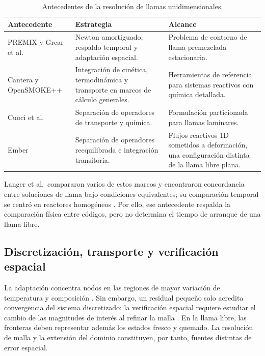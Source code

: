 \documentclass[12pt,a4paper,twoside,openany]{book}
\begin{document}
\begin{table}[htbp]
\centering
\small
\caption{Antecedentes de la resolución de llamas unidimensionales.}
\label{tab:state-art-solvers}
\begin{tabularx}{\textwidth}{@{}p{}YY@{}}
\toprule
\textbf{Antecedente} & \textbf{Estrategia} & \textbf{Alcance} \\
\midrule
PREMIX y Grcar et al.\ \cite{KeePremix1998,Grcar1988} &
Newton amortiguado, respaldo temporal y adaptación espacial. &
Problema de contorno de llama premezclada estacionaria. \\
Cantera y OpenSMOKE++ \cite{GoodwinCantera2025,CuociOpenSMOKE2015} &
Integración de cinética, termodinámica y transporte en marcos de cálculo
generales. &
Herramientas de referencia para sistemas reactivos con química detallada. \\
Cuoci et al.\ \cite{CuociOperatorSplitting2013} &
Separación de operadores de transporte y química. &
Formulación particionada para llamas laminares. \\
Ember \cite{LongEmber2018} &
Separación de operadores reequilibrada e integración transitoria. &
Flujos reactivos 1D sometidos a deformación, una configuración distinta
de la llama libre plana. \\
\bottomrule
\end{tabularx}
\end{table}

Langer et al.\ compararon varios de estos marcos y encontraron concordancia
entre soluciones de llama bajo condiciones equivalentes; su comparación
temporal se centró en reactores homogéneos \cite{Langer2018}. Por ello, ese
antecedente respalda la comparación física entre códigos, pero no determina
el tiempo de arranque de una llama libre.

\subsection{Discretización, transporte y verificación espacial}
\label{sec:discretization-transport-mesh}

La adaptación concentra nodos en las regiones de mayor variación de temperatura
y composición \cite{KeePremix1998,Smooke1991}. Sin embargo, un residual pequeño
solo acredita convergencia del sistema discretizado: la verificación espacial
requiere estudiar el cambio de las magnitudes de interés al refinar la malla
\cite{Roache1998}. En la llama libre, las fronteras deben representar además
los estados fresco y quemado. La resolución de malla y la extensión del
dominio constituyen, por tanto, fuentes distintas de error espacial.
\end{document}
